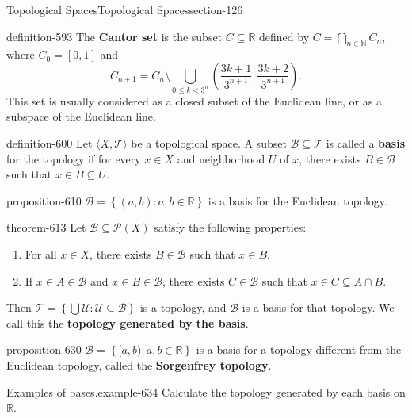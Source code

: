 \documentclass[oneside,10pt,]{article}
\newcommand{\terminology}[1]{\textbf{#1}}
\newcommand{\tuple}[1]{\langle #1 \rangle}
\newcommand{\mb}{\mathbb}
\newcommand{\mc}{\mathcal}
\newcommand{\setBuilder}[2]{\left\{#1:#2\right\}}
\newcommand{\lt}{<}
\begin{document}
\begin{sectionptx}{Topological Spaces}{}{Topological Spaces}{}{}{section-126}
\begin{definition}{}{definition-593}
\hypertarget{p-594}{}%
The \terminology{Cantor set} is the subset \(C\subseteq\mb R\) defined by \(C=\bigcap_{n\in\mb N} C_n\), where \(C_0=[0,1]\) and%
\begin{equation*}
C_{n+1}=C_n\setminus\bigcup_{0\leq k\lt 3^n} 
\left(\frac{3k+1}{3^{n+1}},\frac{3k+2}{3^{n+1}}\right).
\end{equation*}
This set is usually considered as a closed subset of the Euclidean line, or as a subspace of the Euclidean line.%
\end{definition}
\begin{definition}{}{definition-600}%
\hypertarget{p-601}{}%
Let \(\tuple{X,\mc T}\) be a topological space. A subset \(\mc B\subseteq\mc T\) is called a \terminology{basis} for the topology if for every \(x\in X\) and neighborhood \(U\) of \(x\), there exists \(B\in\mc B\) such that \(x\in B\subseteq U\).%
\end{definition}
\begin{proposition}{}{}{proposition-610}%
\hypertarget{p-611}{}%
\(\mc B=\setBuilder{(a,b)}{a,b\in\mb R}\) is a basis for the Euclidean topology.%
\end{proposition}
\begin{theorem}{}{}{theorem-613}%
\hypertarget{p-614}{}%
Let \(\mc B\subseteq\mc P(X)\) satisfy the following properties:%
\leavevmode%
\begin{enumerate}
\item\hypertarget{li-617}{}For all \(x\in X\), there exists \(B\in\mc B\) such that \(x\in B\).%
\item\hypertarget{li-621}{}If \(x\in A\in\mc B\) and \(x\in B\in\mc B\), there exists \(C\in\mc B\) such that \(x\in C\subseteq A\cap B\).%
\end{enumerate}
\hypertarget{p-626}{}%
Then \(\mc T=\setBuilder{\bigcup\mc U}{\mc U\subseteq\mc B}\) is a topology, and \(\mc B\) is a basis for that topology. We call this the \terminology{topology generated by the basis}.%
\end{theorem}
\begin{proposition}{}{}{proposition-630}%
\hypertarget{p-631}{}%
\(\mc B=\setBuilder{[a,b)}{a,b\in\mb R}\) is a basis for a topology different from the Euclidean topology, called the \terminology{Sorgenfrey topology}.%
\end{proposition}
\begin{example}{Examples of bases.}{example-634}%
\hypertarget{p-636}{}%
Calculate the topology generated by each basis on \(\mb R\).%
\leavevmode%
\begin{enumerate}

\end{enumerate}
\end{example}
\end{sectionptx}
\end{document}
